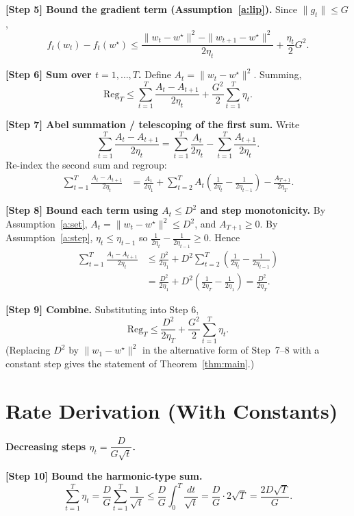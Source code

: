 \documentclass[11pt]{article}
\begin{document}
\textbf{[Step 5] Bound the gradient term (Assumption~\ref{a:lip}).}
Since $\|g_t\|\le G$,
\[
f_t(w_t) - f_t(w^\star)
\le \frac{\|w_t - w^\star\|^2 - \|w_{t+1} - w^\star\|^2}{2\eta_t}
   + \frac{\eta_t}{2}G^2.
\]

\textbf{[Step 6] Sum over $t = 1,\ldots,T$.}
Define $A_t = \|w_t - w^\star\|^2$. Summing,
\[
\mathrm{Reg}_T
\le \sum_{t=1}^{T} \frac{A_t - A_{t+1}}{2\eta_t}
   + \frac{G^2}{2}\sum_{t=1}^{T}\eta_t.
\]

\textbf{[Step 7] Abel summation / telescoping of the first sum.}
Write
\[
\sum_{t=1}^{T}\frac{A_t - A_{t+1}}{2\eta_t}
= \sum_{t=1}^{T}\frac{A_t}{2\eta_t} - \sum_{t=1}^{T}\frac{A_{t+1}}{2\eta_t}.
\]
Re-index the second sum and regroup:
\begin{align*}
\sum_{t=1}^{T}\frac{A_t - A_{t+1}}{2\eta_t}
&= \frac{A_1}{2\eta_1}
 + \sum_{t=2}^{T} A_t\left(\frac{1}{2\eta_t} - \frac{1}{2\eta_{t-1}}\right)
 - \frac{A_{T+1}}{2\eta_T}.
\end{align*}

\textbf{[Step 8] Bound each term using $A_t \le D^2$ and step monotonicity.}
By Assumption~\ref{a:set}, $A_t = \|w_t-w^\star\|^2 \le D^2$, and $A_{T+1}\ge 0$.
By Assumption~\ref{a:step}, $\eta_t\le\eta_{t-1}$ so
$\frac{1}{2\eta_t}-\frac{1}{2\eta_{t-1}}\ge 0$. Hence
\begin{align*}
\sum_{t=1}^{T}\frac{A_t - A_{t+1}}{2\eta_t}
&\le \frac{D^2}{2\eta_1}
 + D^2\sum_{t=2}^{T}\left(\frac{1}{2\eta_t} - \frac{1}{2\eta_{t-1}}\right) \\
&= \frac{D^2}{2\eta_1}
 + D^2\left(\frac{1}{2\eta_T} - \frac{1}{2\eta_1}\right)
 = \frac{D^2}{2\eta_T}.
\end{align*}

\textbf{[Step 9] Combine.}
Substituting into Step 6,
\[
\boxed{\;\mathrm{Reg}_T
\le \frac{D^2}{2\eta_T} + \frac{G^2}{2}\sum_{t=1}^{T}\eta_t.\;}
\]
(Replacing $D^2$ by $\|w_1-w^\star\|^2$ in the alternative form of Step~7--8 with a
constant step gives the statement of Theorem~\ref{thm:main}.)

\section*{Rate Derivation (With Constants)}

\textbf{Decreasing steps $\eta_t = \dfrac{D}{G\sqrt{t}}$.}

\textbf{[Step 10] Bound the harmonic-type sum.}
\[
\sum_{t=1}^{T}\eta_t
= \frac{D}{G}\sum_{t=1}^{T}\frac{1}{\sqrt{t}}
\le \frac{D}{G}\int_{0}^{T}\frac{dt}{\sqrt{t}}
= \frac{D}{G}\cdot 2\sqrt{T}
= \frac{2D\sqrt{T}}{G}.
\]
\end{document}
